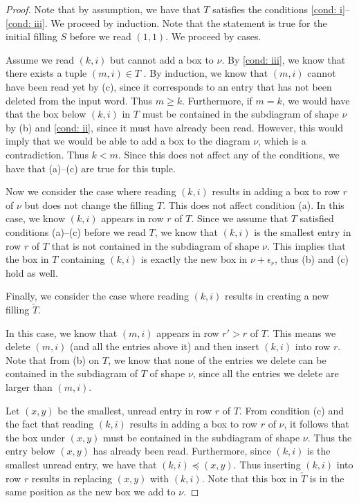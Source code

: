     \begin{proof}
    Note that by assumption, we have that $T$ satisfies the conditions \ref{cond: i}--\ref{cond: iii}. 
    We proceed by induction. Note that the statement is true for the initial filling $S$ before we read $(1,1)$. We proceed by cases.

    Assume we read $(k,i)$ but cannot add a box to $\nu$. By \ref{cond: iii}, we know that there exists a tuple $(m,i)\in T$ . By induction, we know that $(m,i)$ cannot have been read yet by (c), since it corresponds to an entry that has not been deleted from the input word. Thus $m\geq k$.
    Furthermore, if $m=k$, we would have that the box below $(k,i)$ in $T$ must be contained in the subdiagram of shape $\nu$ by (b) and \ref{cond: ii}, since it must have already been read. However, this would imply that we would be able to add a box to the diagram $\nu$, which is a contradiction. Thus $k<m$. Since this does not affect any of the conditions, we have that (a)--(c) are true for this tuple.

    Now we consider the case where reading $(k,i)$ results in adding a box to row $r$ of $\nu$ but does not change the filling $T$.
    This does not affect condition (a).     
    In this case, we know $(k,i)$ appears in row $r$ of $T$. Since we assume that $T$ satisfied conditions (a)--(c) before we read $T$, we know that $(k,i)$ is the smallest entry in row $r$ of $T$ that is not contained in the subdiagram of shape $\nu$. This implies that the box in $T$ containing $(k,i)$ is exactly the new box in $\nu + \epsilon_r$, thus (b) and (c) hold as well. 

    Finally, we consider the case where reading $(k,i)$ results in creating a new filling $\tilde{T}$. 

    In this case, we know that $(m,i)$ appears in row $r'>r$ of $T$.
    This means we delete $(m,i)$ (and all the entries above it) and then insert $(k,i)$ into row $r$. Note that from (b) on $T$, we know that none of the entries we delete can be contained in the subdiagram of $T$ of shape $\nu$, since all the entries we delete are larger than $(m,i)$. 

   Let $(x,y)$ be the smallest, unread entry in row $r$ of $T$. From condition (c) and the fact that reading $(k,i)$ results in adding a box to row $r$ of $\nu$, it follows that the box under $(x,y)$ must be contained in the subdiagram of shape $\nu$. Thus the entry below $(x,y)$ has already been read. Furthermore, since $(k,i)$ is the smallest unread entry, we have that $(k,i)\preceq (x,y)$. Thus inserting $(k,i)$ into row $r$ results in replacing $(x,y)$ with $(k,i)$. Note that this box in $\tilde{T}$ is in the same position as the new box we add to $\nu$. 


\end{proof}
